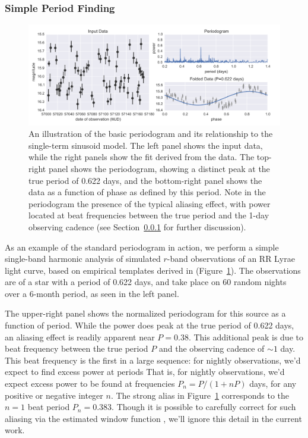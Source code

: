\documentclass[12pt,preprint]{aastex}
\newcommand{\Fig}[1]{Figure~\ref{fig:#1}}
\newcommand{\fig}[1]{\Fig{#1}}
\newcommand{\figlabel}[1]{\label{fig:#1}}
\newcommand{\Sect}[1]{Section~\ref{sect:#1}}
\newcommand{\sect}[1]{\Sect{#1}}
\newcommand{\sectlabel}[1]{\label{sect:#1}}
\begin{document}
\subsubsection{Simple Period Finding}
\sectlabel{simple_period}

\begin{figure}
  \centering
  \includegraphics[width=\textwidth]{fig01.pdf}
  \caption{
    An illustration of the basic periodogram and its relationship to the single-term sinusoid model. The left panel shows the input data, while the right panels show the fit derived from the data. The top-right panel shows the periodogram, showing a distinct peak at the true period of 0.622 days, and the bottom-right panel shows the data as a function of phase as defined by this period. Note in the periodogram the presence of the typical aliasing effect, with power located at beat frequencies between the true period and the 1-day observing cadence (see \sect{simple_period} for further discussion).
  }
  \figlabel{basic_example}
\end{figure}

As an example of the standard periodogram in action, we perform a simple single-band harmonic analysis of simulated $r$-band observations of an RR Lyrae light curve, based on empirical templates derived in \citet{Sesar2010} (\fig{basic_example}). The observations are of a star with a period of 0.622 days, and take place on 60 random nights over a 6-month period, as seen in the left panel.

The upper-right panel shows the normalized periodogram for this source as a function of period. While the power does peak at the true period of 0.622 days, an aliasing effect is readily apparent near $P=0.38$. This additional peak is due to beat frequency between the true period $P$ and the observing cadence of $\sim 1$ day. This beat frequency is the first in a large sequence: for nightly observations, we'd expect to find excess power at periods That is, for nightly observations, we'd expect excess power to be found at frequencies $P_n = P / (1 + nP)$ days, for any positive or negative integer $n$. The strong alias in \fig{basic_example} corresponds to the $n=1$ beat period $P_n=0.383$. Though it is possible to carefully correct for such aliasing via the estimated window function \citep[e.g.][]{Roberts87}, we'll ignore this detail in the current work.
\end{document}
